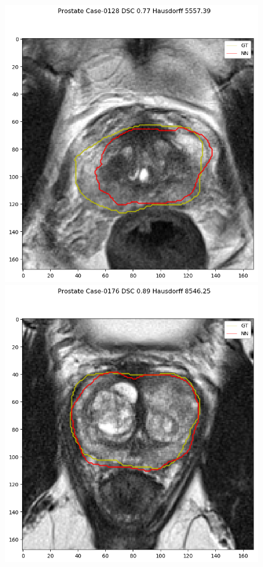 \begin{figure}[h]
    \centering
    \includegraphics[totalheight=.2\textheight]{imgs/results/Prostate_Px_Challenge__P_yes_ROI_MIN_Case-0128.png}
    \includegraphics[totalheight=.2\textheight]{imgs/results/Prostate_Px_Challenge__P_yes_ROI_MEAN_Case-0176.png}

\end{figure}
